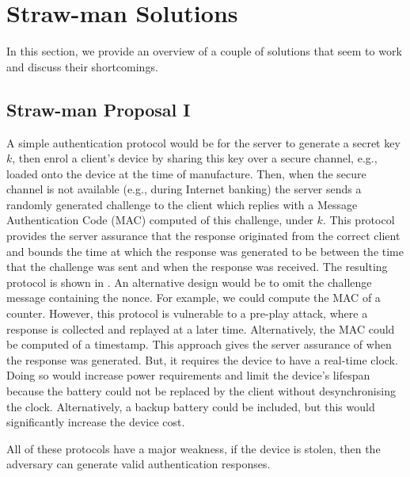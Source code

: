 


\section{Straw-man Solutions}\label{sec::Straw-man-Solutions}
In this section, we provide an overview of a couple of solutions that seem to work and discuss their shortcomings. 

\subsection{Straw-man Proposal I}\label{sec:straw-man-1}

A simple authentication protocol would be for the server to generate a secret key $k$, then enrol a client's device by sharing this key over a secure channel, e.g., loaded onto the device at the time of manufacture.
Then, when the secure channel is not available (e.g., during Internet banking) the server sends a
randomly generated challenge to the client which replies with a Message Authentication Code (MAC)  computed of this challenge, under $k$.
This protocol provides the server assurance
that the response originated from the correct client and
bounds the time at which the response was generated to be between the time that the challenge was sent and when the response was received. 
%
%
The resulting protocol is shown in .  An alternative design would be to omit the challenge message containing
the nonce. For example, we could compute the MAC of a counter. However, this protocol is vulnerable to a pre-play attack, where a
response is collected and replayed at a later time. Alternatively, the
MAC could be computed of a timestamp. This approach
gives the server assurance of when the response was generated.  But, it
requires the device to have a real-time clock. Doing so
would increase power requirements and limit the device's lifespan because
the battery could not be replaced by the client without desynchronising
the clock. Alternatively, a backup battery could be included, but this
would significantly increase the device cost.

All of these protocols have a major weakness, if the device is stolen, then the adversary can generate valid
authentication responses. %






